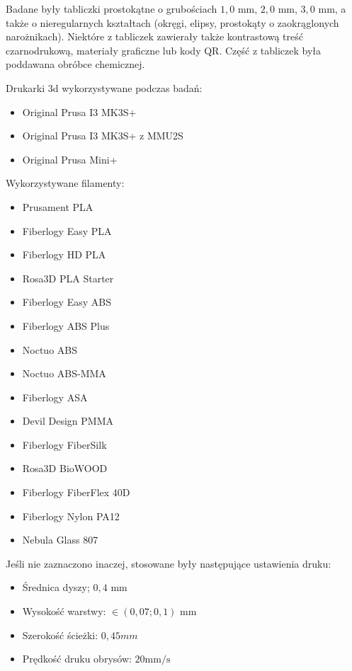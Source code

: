 \documentclass[12pt,a4paper]{article}
\begin{document}
Badane były tabliczki prostokątne o grubościach $1{,}0 \text{ mm}$, $2{,}0 \text{ mm}$, $3{,}0 \text{ mm}$, a także o nieregularnych kształtach (okręgi, elipsy, prostokąty o zaokrąglonych narożnikach).
Niektóre z tabliczek zawierały także kontrastową treść czarnodrukową, materiały graficzne lub kody QR.
Część z tabliczek była poddawana obróbce chemicznej.

Drukarki 3d wykorzystywane podczas badań:
\begin{itemize}
\item Original Prusa I3 MK3S+
\item Original Prusa I3 MK3S+ z MMU2S
\item Original Prusa Mini+
\end{itemize}

Wykorzystywane filamenty:
\begin{itemize}
\item Prusament PLA
\item Fiberlogy Easy PLA
\item Fiberlogy HD PLA
\item Rosa3D PLA Starter
\item Fiberlogy Easy ABS
\item Fiberlogy ABS Plus
\item Noctuo ABS
\item Noctuo ABS-MMA
\item Fiberlogy ASA
\item Devil Design PMMA
\item Fiberlogy FiberSilk
\item Rosa3D BioWOOD
\item Fiberlogy FiberFlex 40D
\item Fiberlogy Nylon PA12
\item Nebula Glass 807
\end{itemize}

Jeśli nie zaznaczono inaczej, stosowane były następujące ustawienia druku:
\begin{itemize}
\item Średnica dyszy; $0{,}4\text{ mm}$
\item Wysokość warstwy: $\in (0{,}07; 0{,}1) \text{ mm}$
\item Szerokość ścieżki: $0{,}45 mm$
\item Prędkość druku obrysów: $20 \text{mm/s}$
\end{itemize}
\end{document}
